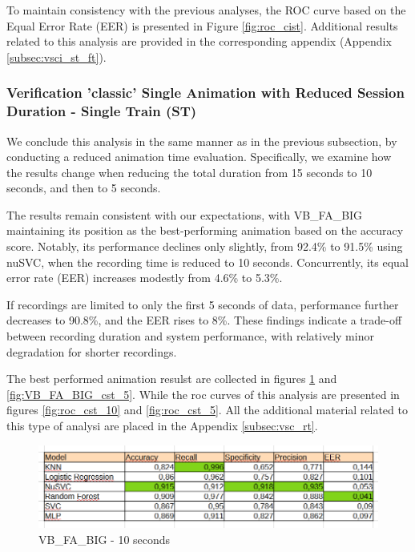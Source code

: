 \documentclass{article}
\begin{document}
To maintain consistency with the previous analyses, the ROC curve based on the Equal Error Rate (EER) is presented in Figure \ref{fig:roc_cist}. 
Additional results related to this analysis are provided in the corresponding appendix (Appendix \ref{subsec:vsci_st_ft}).
\FloatBarrier

\subsubsection{Verification 'classic' Single Animation with Reduced Session Duration - Single Train (ST)}

We conclude this analysis in the same manner as in the previous subsection, by conducting a reduced animation time evaluation. 
Specifically, we examine how the results change when reducing the total duration from 15 seconds to 10 seconds, and then to 5 seconds.

The results remain consistent with our expectations, with VB\_FA\_BIG maintaining its position as the best-performing animation based on the accuracy score. 
Notably, its performance declines only slightly, from 92.4\% to 91.5\% using nuSVC, when the recording time is reduced to 10 seconds. 
Concurrently, its equal error rate (EER) increases modestly from 4.6\% to 5.3\%.

If recordings are limited to only the first 5 seconds of data, performance further decreases to 90.8\%, and the EER rises to 8\%. 
These findings indicate a trade-off between recording duration and system performance, with relatively minor degradation for shorter recordings.

The best performed animation resulst are collected in figures \ref{fig:VB_FA_BIG_cst_10} and \ref{fig:VB_FA_BIG_cst_5}.
While the roc curves of this analysis are presented in figures \ref{fig:roc_cst_10} and \ref{fig:roc_cst_5}.
All the additional material related to this type of analysi are placed in the Appendix \ref{subsec:vsc_rt}.

\begin{figure}[ht]
    \centering
    \includegraphics[width = 0.8
    \textwidth]{Images/Results/Classic_procedure/five_ten/st/ten/VB_FA_BIG.png}
    \caption{VB\_FA\_BIG - 10 seconds}
    \label{fig:VB_FA_BIG_cst_10}
\end{figure}
\end{document}
